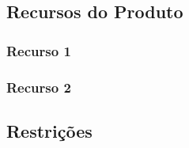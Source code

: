 \subsection{Recursos do Produto}




\subsubsection{Recurso 1}

\subsubsection{Recurso 2}

\subsection{Restrições}

